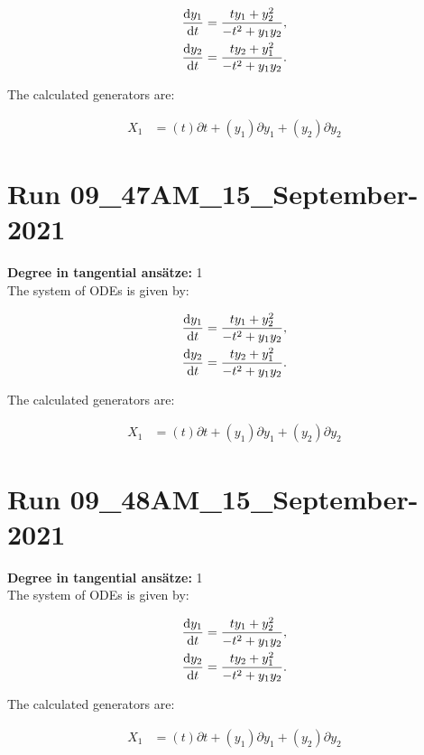 \begin{align*}
\dv{y_{1}}{t}&=\frac{t y_{1} + y_{2}^{2}}{- t^{2} + y_{1} y_{2}},\\
\dv{y_{2}}{t}&=\frac{t y_{2} + y_{1}^{2}}{- t^{2} + y_{1} y_{2}}.\\
\end{align*}

\noindent The calculated generators are:

\begin{align*}
X_{1}&=\left( t \right)\partial t+\left( y_{1} \right)\partial y_{1}+\left( y_{2} \right)\partial y_{2}\end{align*}
\section*{Run 09\_47AM\_15\_September-2021}
\textbf{Degree in tangential ansätze:}	1\\
The system of ODEs is given by:

\begin{align*}
\dv{y_{1}}{t}&=\frac{t y_{1} + y_{2}^{2}}{- t^{2} + y_{1} y_{2}},\\
\dv{y_{2}}{t}&=\frac{t y_{2} + y_{1}^{2}}{- t^{2} + y_{1} y_{2}}.\\
\end{align*}

\noindent The calculated generators are:

\begin{align*}
X_{1}&=\left( t \right)\partial t+\left( y_{1} \right)\partial y_{1}+\left( y_{2} \right)\partial y_{2}\end{align*}
\section*{Run 09\_48AM\_15\_September-2021}
\textbf{Degree in tangential ansätze:}	1\\
The system of ODEs is given by:

\begin{align*}
\dv{y_{1}}{t}&=\frac{t y_{1} + y_{2}^{2}}{- t^{2} + y_{1} y_{2}},\\
\dv{y_{2}}{t}&=\frac{t y_{2} + y_{1}^{2}}{- t^{2} + y_{1} y_{2}}.\\
\end{align*}

\noindent The calculated generators are:

\begin{align*}
X_{1}&=\left( t \right)\partial t+\left( y_{1} \right)\partial y_{1}+\left( y_{2} \right)\partial y_{2}\end{align*}
